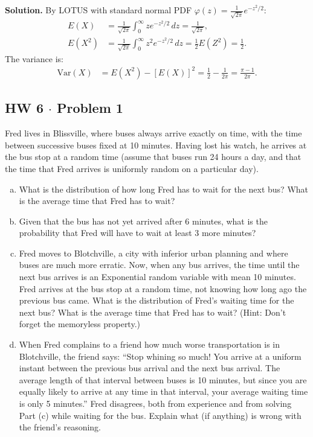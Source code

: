 \documentclass[11pt,a4paper]{article}
\begin{document}
\noindent \textbf{Solution.} By LOTUS with standard normal PDF $\varphi(z) = \frac{1}{\sqrt{2\pi}}e^{-z^2/2}$:
\begin{align*}
E(X) &= \frac{1}{\sqrt{2\pi}} \int_{0}^{\infty} z e^{-z^2/2} \, dz = \frac{1}{\sqrt{2\pi}}, \\
E(X^2) &= \frac{1}{\sqrt{2\pi}} \int_{0}^{\infty} z^2 e^{-z^2/2} \, dz = \frac{1}{2} E(Z^2) = \frac{1}{2}.
\end{align*}
The variance is:
\begin{align*}
\text{Var}(X) &= E(X^2) - [E(X)]^2 = \frac{1}{2} - \frac{1}{2\pi} = \frac{\pi - 1}{2\pi}.
\end{align*}

\vspace{10pt}
\subsection{HW 6 $\cdot$ Problem 1}
\begin{tcolorbox}[title={HW 6 $\cdot$ Problem 1}]
Fred lives in Blissville, where buses always arrive exactly on time, with the time between successive buses fixed at 10 minutes. Having lost his watch, he arrives at the bus stop at a random time (assume that buses run 24 hours a day, and that the time that Fred arrives is uniformly random on a particular day).
\begin{enumerate}[(a)]
\item What is the distribution of how long Fred has to wait for the next bus? What is the average time that Fred has to wait?
\item Given that the bus has not yet arrived after 6 minutes, what is the probability that Fred will have to wait at least 3 more minutes?
\item Fred moves to Blotchville, a city with inferior urban planning and where buses are much more erratic. Now, when any bus arrives, the time until the next bus arrives is an Exponential random variable with mean 10 minutes. Fred arrives at the bus stop at a random time, not knowing how long ago the previous bus came. What is the distribution of Fred's waiting time for the next bus? What is the average time that Fred has to wait? (Hint: Don't forget the memoryless property.)
\item When Fred complains to a friend how much worse transportation is in Blotchville, the friend says: ``Stop whining so much! You arrive at a uniform instant between the previous bus arrival and the next bus arrival. The average length of that interval between buses is 10 minutes, but since you are equally likely to arrive at any time in that interval, your average waiting time is only 5 minutes.''
Fred disagrees, both from experience and from solving Part (c) while waiting for the bus. Explain what (if anything) is wrong with the friend's reasoning.
\end{enumerate}
\end{tcolorbox}
\end{document}
